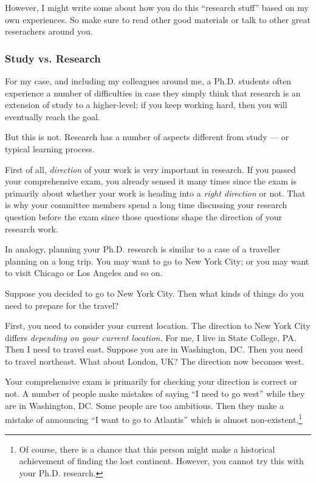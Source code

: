 \documentclass[11pt]{article}
\begin{document}
However, I might write some about how you do this ``research stuff'' based on
my own experiences. So make sure to read other good materials or talk to other
great reserachers around you.

\subsubsection{Study vs. Research}

For my case, and including my colleagues around me, a Ph.D. students often
experience a number of difficulties in case they simply think that research is
an extension of study to a higher-level; if you keep working hard, then you
will eventually reach the goal.

But this is not. Research has a number of aspects different from study --- or
typical learning process.

First of all, \emph{direction} of your work is very important in research. If
you passed your comprehensive exam, you already sensed it many times since the
exam is primarily about whether your work is heading into a \emph{right
direction} or not. That is why your committee members spend a long time
discussing your research question before the exam since those questions shape
the direction of your research work. 

In analogy, planning your Ph.D. research is similar to a case of a traveller
planning on a long trip. You may want to go to New York City; or you may want
to visit Chicago or Los Angeles and so on. 

Suppose you decided to go to New York City. Then what kinds of things do you
need to prepare for the travel?

First, you need to consider your current location. The direction to New York
City differs \emph{depending on your current location.} For me, I live in
State College, PA. Then I need to travel east. Suppose you are in Washington,
DC. Then you need to travel northeast. What about London, UK? The direction
now becomes west.

Your comprehensive exam is primarily for checking your direction is correct or
not. A number of people make mistakes of saying ``I need to go west'' while
they are in Washington, DC. Some people are too ambitious. Then they make a
mistake of announcing ``I want to go to Atlantis'' which is almost
non-existent.\footnote{Of course, there is a chance that this person might
make a historical achievement of finding the lost continent.  However, you
cannot try this with your Ph.D. research.}
\end{document}
